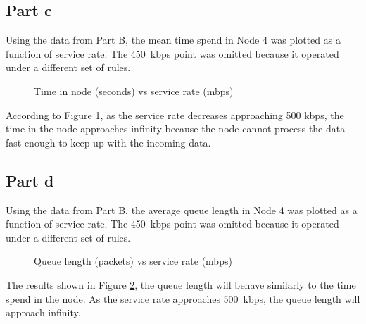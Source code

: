 \documentclass[12pt,letterpaper]{article}
\begin{document}
\subsection*{Part c}

Using the data from Part B, the mean time spend in Node 4 was plotted as a function
of service rate. The \SI{450}{kbps} point was omitted because it operated under a
different set of rules.

\begin{figure}[h!]
  \centering
  \caption{Time in node (seconds) vs service rate (mbps)}
  \label{fig:pc}
\end{figure}

According to Figure \ref{fig:pc}, as the service rate decreases approaching 
500 kbps, the time in the node approaches infinity because the node cannot
process the data fast enough to keep up with the incoming data.

\pagebreak

\subsection*{Part d}

Using the data from Part B, the average queue length in Node 4 was plotted as a function
of service rate. The \SI{450}{kbps} point was omitted because it operated under a
different set of rules.

\begin{figure}[h!]
  \centering
  \caption{Queue length (packets) vs service rate (mbps)}
  \label{fig:ql}
\end{figure}

The results shown in Figure \ref{fig:ql}, the queue length will behave similarly to
the time spend in the node. As the service rate approaches \SI{500}{kbps}, the queue
length will approach infinity.
\end{document}
